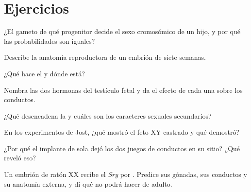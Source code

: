 \section{Ejercicios}

\begin{exercise}[$\star$]\label{exo:g11:becoming-male-female:1}
¿El gameto de qué progenitor decide el sexo cromosómico de un hijo, y
por qué las probabilidades son iguales?
\end{exercise}

\begin{exercise}[$\star$]\label{exo:g11:becoming-male-female:2}
Describe la anatomía reproductora de un embrión de siete semanas.
\end{exercise}

\begin{exercise}[$\star$]\label{exo:g11:becoming-male-female:3}
¿Qué hace el  y dónde está?
\end{exercise}

\begin{exercise}[$\star$]\label{exo:g11:becoming-male-female:4}
Nombra las dos hormonas del testículo fetal y da el efecto de cada una
sobre los conductos.
\end{exercise}

\begin{exercise}[$\star$]\label{exo:g11:becoming-male-female:5}
¿Qué desencadena la  y cuáles son los caracteres sexuales
secundarios?
\end{exercise}

\begin{exercise}[$\star\star$]\label{exo:g11:becoming-male-female:6}
En los experimentos de Jost, ¿qué mostró el feto XY castrado y qué
demostró?
\end{exercise}

\begin{exercise}[$\star\star$]\label{exo:g11:becoming-male-female:7}
¿Por qué el implante de  sola dejó los dos juegos de
conductos en su sitio? ¿Qué reveló eso?
\end{exercise}

\begin{exercise}[$\star\star$]\label{exo:g11:becoming-male-female:8}
Un embrión de ratón XX recibe el  \emph{Sry} por .
Predice sus gónadas, sus conductos y su anatomía externa, y di qué no
podrá hacer de adulto.
\end{exercise}

